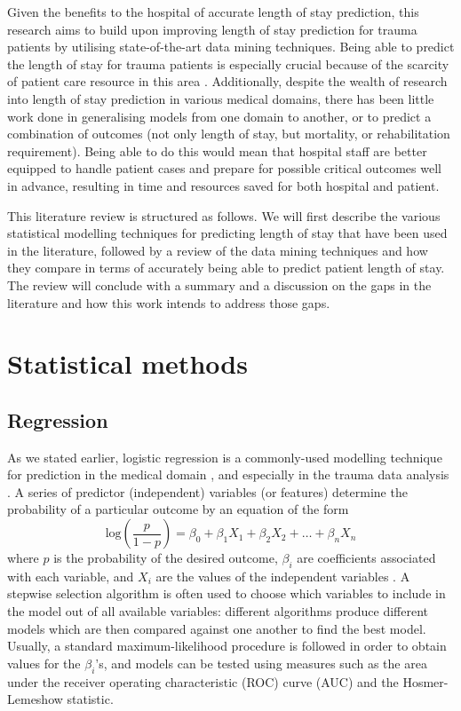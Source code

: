 Given the benefits to the hospital of accurate length of stay prediction,
this research aims to build upon improving length of stay prediction for trauma
patients by utilising state-of-the-art data mining techniques. Being able to
predict the length of stay for trauma patients is especially crucial because of
the scarcity of patient care resource in this area \citep{Yang2010}.
Additionally,
despite the wealth of research into length of stay prediction in various
medical domains, there has been little work done in generalising models from
one domain to another, or to predict a combination of outcomes (not only
length of stay, but mortality, or rehabilitation requirement). Being able to
do this would mean that hospital staff are better equipped to handle patient
cases and prepare for possible critical outcomes well in advance, resulting
in time and resources saved for both hospital and patient.

This literature review is structured as follows. We will first describe the
various statistical modelling techniques for predicting length of stay that
have been used in the literature, followed by a review of the data mining
techniques and how they compare in terms of accurately being able to predict
patient length of stay. The review will conclude with a summary and a
discussion on the gaps in the literature and how this work intends to address
those gaps.

\section{Statistical methods}
\subsection{Regression}
As we stated earlier, logistic regression is a commonly-used modelling
technique for prediction in the medical domain \citep{Tu1996}, and especially
in the trauma data analysis \citep{Gabbe2005}. A series of
predictor (independent) variables (or features) determine the probability of a
particular outcome by an equation of the form
\begin{equation}
\mathrm{log}\left(\frac{p}{1-p}\right) = \beta_0 + \beta_1X_1 + \beta_2X_2 + \dots + \beta_nX_n
\end{equation}
where $p$ is the probability of the desired outcome, $\beta_i$ are coefficients
associated with each variable, and $X_i$ are the values of the independent
variables \citep{Hosmer1989}. A stepwise selection algorithm is often used to
choose which variables to include in the model out of all available variables:
different algorithms produce different models which are then compared against
one another to find the best model. Usually, a standard maximum-likelihood
procedure is followed in order to obtain values for the $\beta_i$'s, and models
can be tested using measures such as the area under the receiver operating
characteristic (ROC) curve (AUC) and the Hosmer-Lemeshow statistic.

